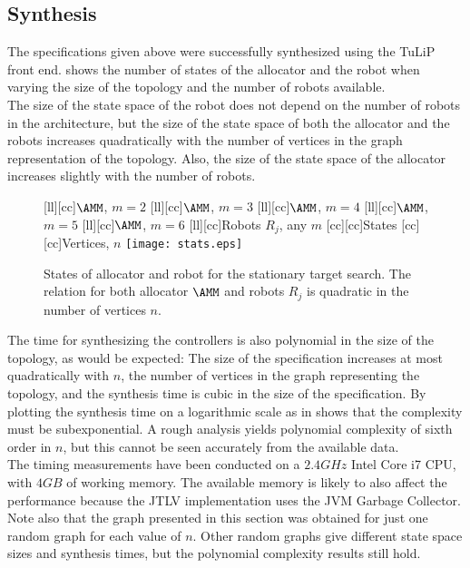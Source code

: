 \subsection{Synthesis} 

The specifications given above were successfully synthesized using the TuLiP front end.  shows the number of states of the allocator and the robot when varying the size of the topology and the number of robots available.\\

The size of the state space of the robot does not depend on the number of robots in the architecture, but the size of the state space of both the allocator and the robots increases quadratically with the number of vertices in the graph representation of the topology. Also, the size of the state space of the allocator increases slightly with the number of robots.\\

\begin{figure}
\centering
	[ll][cc]{\footnotesize{$\AMM$, $m=2$}}
	[ll][cc]{\footnotesize{$\AMM$, $m=3$}}
	[ll][cc]{\footnotesize{$\AMM$, $m=4$}}
	[ll][cc]{\footnotesize{$\AMM$, $m=5$}}
	[ll][cc]{\footnotesize{$\AMM$, $m=6$}}
	[ll][cc]{\footnotesize{Robots $R_j$, any $m$}}
	[cc][cc]{\footnotesize{States}}
	[cc][cc]{\footnotesize{Vertices, $n$}}
	\texttt{[image: stats.eps]}
\caption{States of allocator and robot for the stationary target search. The relation for both allocator $\AMM$ and robots $R_j$ is quadratic in the number of vertices $n$.}
\label{fig:statstates}
\end{figure}

The time for synthesizing the controllers is also polynomial in the size of the topology, as would be expected: The size of the specification increases at most quadratically with $n$, the number of vertices in the graph representing the topology, and the synthesis time is cubic in the size of the specification. By plotting the synthesis time on a logarithmic scale as in  shows that the complexity must be subexponential. A rough analysis yields polynomial complexity of sixth order in $n$, but this cannot be seen accurately from the available data.\\

The timing measurements have been conducted on a $2.4\unit{GHz}$ Intel Core i7 CPU, with $4\unit{GB}$ of working memory. The available memory is likely to also affect the performance because the JTLV implementation uses the JVM Garbage Collector. Note also that the graph presented in this section was obtained for just one random graph for each value of $n$. Other random graphs give different state space sizes and synthesis times, but the polynomial complexity results still hold.\\

